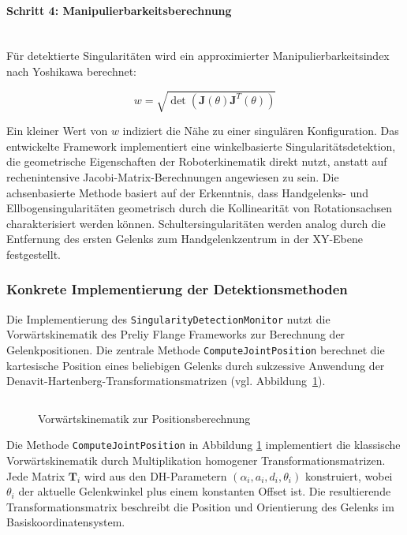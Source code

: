 \paragraph{Schritt 4: Manipulierbarkeitsberechnung}~\\
Für detektierte Singularitäten wird ein approximierter Manipulierbarkeitsindex
nach Yoshikawa berechnet:

\begin{equation}
  w = \sqrt{\det(\mathbf{J}(\theta)\mathbf{J}^T(\theta))}
  \label{eq:manipulability}
\end{equation}
 
Ein kleiner Wert von $w$ indiziert die Nähe zu einer singulären Konfiguration.
Das entwickelte Framework implementiert eine winkelbasierte
Singularitätsdetektion, die geometrische Eigenschaften der Roboterkinematik
direkt nutzt, anstatt auf rechenintensive Jacobi-Matrix-Berechnungen angewiesen
zu sein. Die achsenbasierte Methode basiert auf der Erkenntnis, dass
Handgelenks- und Ellbogensingularitäten geometrisch durch die
Kollinearität von Rotationsachsen
charakterisiert werden können. Schultersingularitäten werden analog durch die
Entfernung des ersten Gelenks zum Handgelenkzentrum in der XY-Ebene
festgestellt.

\subsubsection{Konkrete Implementierung der Detektionsmethoden}
\label{sssec:Implementierung_Detektionsmethoden}
Die Implementierung des \texttt{SingularityDetectionMonitor} nutzt die
Vorwärtskinematik des Preliy Flange Frameworks zur Berechnung der
Gelenkpositionen. Die zentrale Methode \texttt{ComputeJointPosition} berechnet
die kartesische Position eines beliebigen Gelenks durch sukzessive Anwendung
der Denavit-Hartenberg-Transformationsmatrizen (vgl.
Abbildung~\ref{listing:forwardKinematic}).

\begin{figure}[H]
  \inputminted[fontsize=\footnotesize]{csharp}{code-snippets/CalculateJointPos.cs}
  \caption{Vorwärtskinematik zur Positionsberechnung}
  \label{listing:forwardKinematic}
\end{figure}

 
Die Methode \texttt{ComputeJointPosition} in Abbildung
\ref{listing:forwardKinematic} implementiert die klassische
Vorwärtskinematik durch
Multiplikation homogener Transformationsmatrizen. Jede Matrix $\mathbf{T}_i$
wird aus den DH-Parametern $(\alpha_i, a_i, d_i, \theta_i)$ konstruiert, wobei
$\theta_i$ der aktuelle Gelenkwinkel plus einem konstanten Offset ist. Die
resultierende Transformationsmatrix beschreibt die Position und Orientierung des
Gelenks im Basiskoordinatensystem.\\

